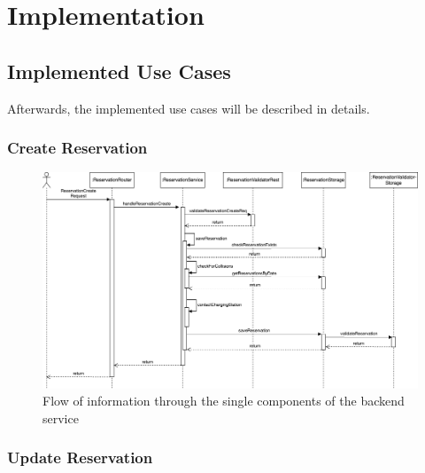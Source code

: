 
\chapter{Implementation}
\label{ch:Implementation}

\section{Implemented Use Cases}
\label{ch:Implementation:sec:Implemented Use Cases}

Afterwards, the implemented use cases will be described in details.

\subsection{Create Reservation}
\label{ch:Implementation:sec:Implemented Use Cases:ssec:Create Reservation}

\begin{figure}[!ht]
    \centering
    \includegraphics[scale=0.4]{resources/images/main/6_implementation/ReservationCreate.png}
    \caption{Flow of information through the single components of the backend service}
    \label{fig:create-reservation-seq-flow}
\end{figure}

\subsection{Update Reservation}
\label{ch:Implementation:sec:Implemented Use Cases:ssec:Update Reservation}


